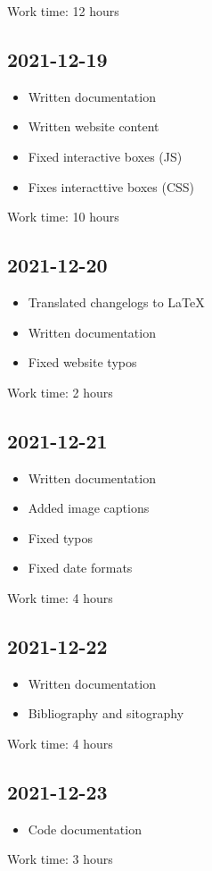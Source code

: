 \documentclass{article}
\begin{document}
Work time: 12 hours

\subsection*{2021-12-19}

\begin{itemize}
    \item Written documentation
    \item Written website content
    \item Fixed interactive boxes (JS)
    \item Fixes interacttive boxes (CSS)
\end{itemize}

Work time: 10 hours

\subsection*{2021-12-20}

\begin{itemize}
    \item Translated changelogs to LaTeX
    \item Written documentation
    \item Fixed website typos
\end{itemize}

Work time: 2 hours

\subsection*{2021-12-21}

\begin{itemize}
    \item Written documentation
    \item Added image captions
    \item Fixed typos
    \item Fixed date formats
\end{itemize}

Work time: 4 hours

\subsection*{2021-12-22}

\begin{itemize}
    \item Written documentation
    \item Bibliography and sitography
\end{itemize}

Work time: 4 hours

\subsection*{2021-12-23}

\begin{itemize}
    \item Code documentation
\end{itemize}

Work time: 3 hours
\end{document}
